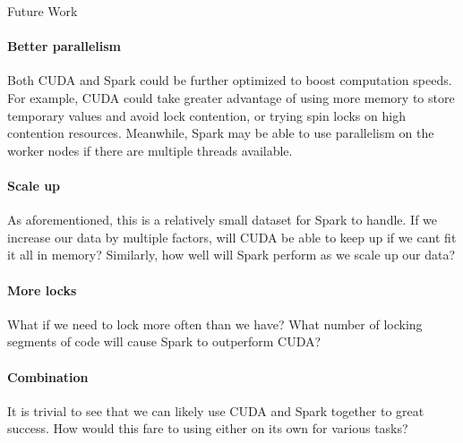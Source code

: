 \documentclass[11pt]{article}
\begin{document}
\begin{section}{Future Work}
\paragraph{Better parallelism}
Both CUDA and Spark could be further optimized to boost computation speeds. For example, CUDA could take greater advantage of using more memory to store temporary values and avoid lock contention, or trying spin locks on high contention resources. Meanwhile, Spark may be able to use parallelism on the worker nodes if there are multiple threads available.
\paragraph{Scale up}
As aforementioned, this is a relatively small dataset for Spark to handle. If we increase our data by multiple factors, will CUDA be able to keep up if we cant fit it all in memory? Similarly, how well will Spark perform as we scale up our data?
\paragraph{More locks}
What if we need to lock more often than we have? What number of locking segments of code will cause Spark to outperform CUDA?
\paragraph{Combination}
It is trivial to see that we can likely use CUDA and Spark together to great success. How would this fare to using either on its own for various tasks?
\end{section}
\end{document}
